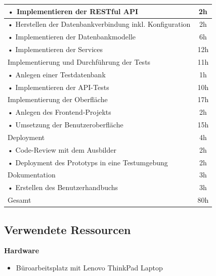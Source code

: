 \documentclass[a4paper,12pt]{article}
\begin{document}
\begin{tabular}{|p{\textwidth}|c|}
    \hline
    \hspace{0.5cm}• Implementieren der RESTful API & 2h \\
    \hline
    \hspace{0.5cm}• Herstellen der Datenbankverbindung inkl. Konfiguration & 2h \\
    \hline
    \hspace{0.5cm}• Implementieren der Datenbankmodelle & 6h \\
    \hline
    \hspace{0.5cm}• Implementieren der Services & 12h \\
    \hline
    \rowcolor{gray}Implementierung und Durchführung der Tests & 11h \\
    \hline
    \hspace{0.5cm}• Anlegen einer Testdatenbank & 1h \\
    \hline
    \hspace{0.5cm}• Implementieren der API-Tests & 10h \\
    \hline
    \rowcolor{gray}Implementierung der Oberfläche & 17h \\
    \hline
    \hspace{0.5cm}• Anlegen des Frontend-Projekts & 2h \\
    \hline
    \hspace{0.5cm}• Umsetzung der Benutzeroberfläche & 15h \\
    \hline
    \rowcolor{gray}Deployment & 4h \\
    \hline
    \hspace{0.5cm}• Code-Review mit dem Ausbilder & 2h \\
    \hline
    \hspace{0.5cm}• Deployment des Prototyps in eine Testumgebung & 2h \\
    \hline
    \rowcolor{gray}Dokumentation & 3h \\
    \hline
    \hspace{0.5cm}• Erstellen des Benutzerhandbuchs & 3h \\
    \hline
    \rowcolor{gray}Gesamt & 80h \\
    \hline
\end{tabular}

\clearpage
\subsection{Verwendete Ressourcen}
\label{sec:ressourcen}

\noindent\textbf{Hardware}
\begin{itemize}
\item Büroarbeitsplatz mit Lenovo ThinkPad Laptop
\end{itemize}
\end{document}
